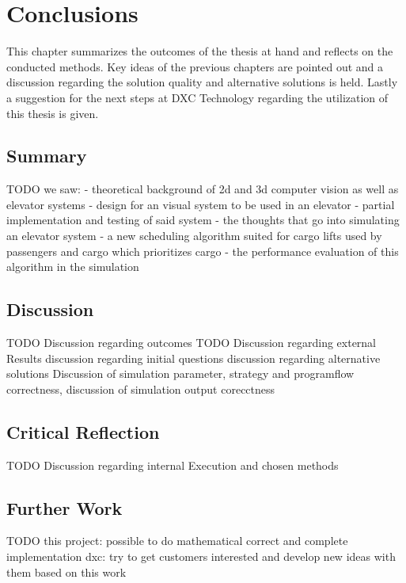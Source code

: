 \chapter{Conclusions}
\label{chap:concl}

This chapter summarizes the outcomes of the thesis at hand 
and reflects on the conducted methods.
Key ideas of the previous chapters are pointed out and a discussion regarding the solution quality and alternative solutions is held.
Lastly a suggestion for the next steps at DXC Technology regarding the utilization of this thesis is given.

\section{Summary}

TODO
we saw:
- theoretical background of 2d and 3d computer vision as well as elevator systems
- design for an visual system to be used in an elevator
- partial implementation and testing of said system
- the thoughts that go into simulating an elevator system
- a new scheduling algorithm suited for cargo lifts used by passengers and cargo
which prioritizes cargo
- the performance evaluation of this algorithm in the simulation


\section{Discussion}

TODO Discussion regarding outcomes
TODO Discussion regarding external Results
discussion regarding initial questions
discussion regarding alternative solutions
Discussion of simulation parameter, strategy and programflow correctness, discussion of simulation output corecctness


\section{Critical Reflection}

TODO  Discussion regarding internal Execution and chosen methods

\section{Further Work}

TODO
this project: possible to do mathematical correct and complete implementation
dxc: try to get customers interested and develop new ideas with them based on this work

